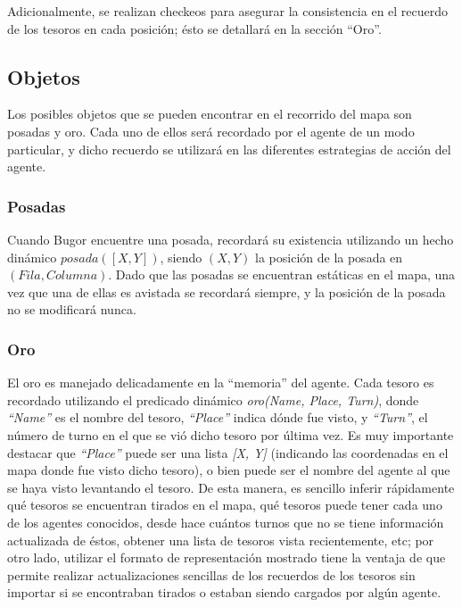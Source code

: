 \documentclass[a4paper,10pt,spanish]{article}
\begin{document}
	Adicionalmente, se realizan checkeos para asegurar la consistencia en el recuerdo de los tesoros en cada posici\'on; \'esto se detallar\'a en la secci\'on ``Oro''.

	\subsection{Objetos}
	
	Los posibles objetos que se pueden encontrar en el recorrido del mapa son posadas y oro. Cada uno de ellos ser\'a recordado por el agente de un modo particular, y dicho recuerdo se utilizar\'a en las diferentes estrategias de acci\'on del agente.
	
		\subsubsection{Posadas}
		
		Cuando Bugor encuentre una posada, recordar\'a su existencia utilizando un hecho din\'amico $posada([X, Y])$, siendo $(X, Y)$ la posici\'on de la posada en $(Fila,Columna)$. Dado que las posadas se encuentran est\'aticas en el mapa, una vez que una de ellas es avistada se recordar\'a siempre, y la posici\'on de la posada no se modificar\'a nunca.
		
		\subsubsection{Oro}
		
		El oro es manejado delicadamente en la ``memoria'' del agente. Cada tesoro es recordado utilizando el predicado din\'amico \emph{oro(Name, Place, Turn)}, donde \emph{``Name''} es el nombre del tesoro, \emph{``Place''} indica d\'onde fue visto, y \emph{``Turn''}, el n\'umero de turno en el que se vi\'o dicho tesoro por \'ultima vez. Es muy importante destacar que \emph{``Place''} puede ser una lista \emph{[X, Y]} (indicando las coordenadas en el mapa donde fue visto dicho tesoro), o bien puede ser el nombre del agente al que se haya visto levantando el tesoro. De esta manera, es sencillo inferir r\'apidamente qu\'e tesoros se encuentran tirados en el mapa, qu\'e tesoros puede tener cada uno de los agentes conocidos, desde hace cu\'antos turnos que no se tiene informaci\'on actualizada de \'estos, obtener una lista de tesoros vista recientemente, etc; por otro lado, utilizar el formato de representaci\'on mostrado tiene la ventaja de que permite realizar actualizaciones sencillas de los recuerdos de los tesoros sin importar si se encontraban tirados o estaban siendo cargados por alg\'un agente.
		
\end{document}
